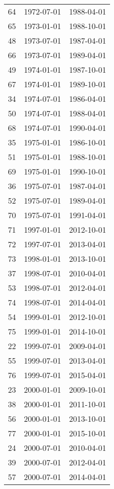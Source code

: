 % 
\begin{tabular}{ccc}
  \hline
  \hline
64 & 1972-07-01 & 1988-04-01 \\ 
  65 & 1973-01-01 & 1988-10-01 \\ 
  48 & 1973-07-01 & 1987-04-01 \\ 
  66 & 1973-07-01 & 1989-04-01 \\ 
  49 & 1974-01-01 & 1987-10-01 \\ 
  67 & 1974-01-01 & 1989-10-01 \\ 
  34 & 1974-07-01 & 1986-04-01 \\ 
  50 & 1974-07-01 & 1988-04-01 \\ 
  68 & 1974-07-01 & 1990-04-01 \\ 
  35 & 1975-01-01 & 1986-10-01 \\ 
  51 & 1975-01-01 & 1988-10-01 \\ 
  69 & 1975-01-01 & 1990-10-01 \\ 
  36 & 1975-07-01 & 1987-04-01 \\ 
  52 & 1975-07-01 & 1989-04-01 \\ 
  70 & 1975-07-01 & 1991-04-01 \\ 
  71 & 1997-01-01 & 2012-10-01 \\ 
  72 & 1997-07-01 & 2013-04-01 \\ 
  73 & 1998-01-01 & 2013-10-01 \\ 
  37 & 1998-07-01 & 2010-04-01 \\ 
  53 & 1998-07-01 & 2012-04-01 \\ 
  74 & 1998-07-01 & 2014-04-01 \\ 
  54 & 1999-01-01 & 2012-10-01 \\ 
  75 & 1999-01-01 & 2014-10-01 \\ 
  22 & 1999-07-01 & 2009-04-01 \\ 
  55 & 1999-07-01 & 2013-04-01 \\ 
  76 & 1999-07-01 & 2015-04-01 \\ 
  23 & 2000-01-01 & 2009-10-01 \\ 
  38 & 2000-01-01 & 2011-10-01 \\ 
  56 & 2000-01-01 & 2013-10-01 \\ 
  77 & 2000-01-01 & 2015-10-01 \\ 
  24 & 2000-07-01 & 2010-04-01 \\ 
  39 & 2000-07-01 & 2012-04-01 \\ 
  57 & 2000-07-01 & 2014-04-01 \\ 

\end{tabular}
